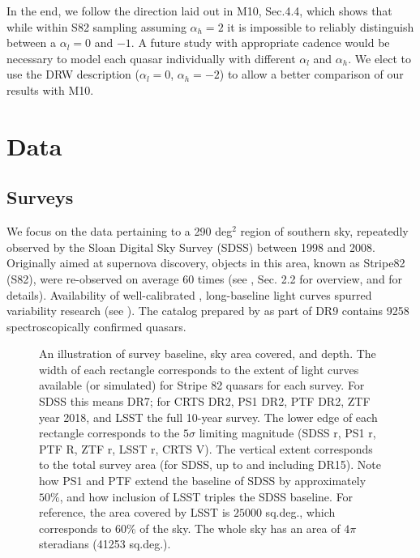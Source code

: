\documentclass[twocolumn]{aastex62}
\begin{document}
In the end, we follow the direction laid out in M10, Sec.4.4, which shows that while within S82 sampling assuming $\alpha_{h}= 2 $ it is impossible to reliably distinguish between a $\alpha_{l}=0$ and $-1$. A future study with appropriate cadence would be necessary to model each quasar individually with different $\alpha_{l}$ and $\alpha_{h}$. We elect to use the DRW description ($\alpha_{l}=0$, $\alpha_{h}=-2$) to allow a better comparison of our results with M10. 

%
%
%
%
%

\section{Data}\label{sec:data}
\subsection{Surveys}
We focus on the data pertaining to a 290 deg$^{2}$ region of southern sky, repeatedly observed by the Sloan Digital Sky Survey (SDSS) between 1998 and 2008. Originally aimed at supernova discovery, objects in this area, known as Stripe82 (S82), were  re-observed on average 60 times (see \citealt{macleod2012}, Sec. 2.2 for overview, and \citealt{annis2014} for details). Availability of well-calibrated \citep{ivezic2007}, long-baseline light curves spurred variability research (see \citealt{sesar2007}). The catalog prepared by \citet{schneider2008} as part of DR9  contains 9258 spectroscopically confirmed quasars.  


\begin{figure*} %
\caption{An illustration of survey baseline, sky area covered, and depth. The width of each rectangle corresponds to the extent of light curves available (or simulated) for Stripe 82 quasars for each survey. For SDSS this means DR7; for CRTS DR2, PS1 DR2, PTF DR2, ZTF year 2018, and LSST the full 10-year survey. The lower edge of each rectangle corresponds to the $5\sigma$ limiting magnitude (SDSS r, PS1 r, PTF R, ZTF r, LSST r, CRTS V). The vertical extent corresponds to the total survey area (for SDSS, up to and including DR15).  Note how PS1 and PTF extend the baseline of SDSS by approximately $50\%$, and how inclusion of LSST triples the SDSS baseline. For reference, the area covered by LSST is $25 000$ sq.deg., which corresponds to  $60\%$ of the sky. The whole sky has an area of $4\pi$ steradians (41253 sq.deg.).}
\label{fig:lcExtent}
\end{figure*} 
\end{document}
